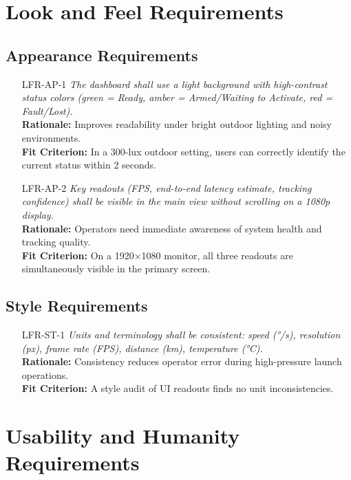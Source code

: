 \documentclass[12pt]{article}
\begin{document}
\section{Look and Feel Requirements}
\subsection{Appearance Requirements}
\begin{itemize}[leftmargin=*]
  \item[LFR-AP-1] \emph{The dashboard shall use a light background with high-contrast
          status colors (green = Ready, amber = Armed/Waiting to Activate, red =
          Fault/Lost).}\\ \textbf{Rationale:} Improves readability under bright outdoor
        lighting and noisy environments.\\ \textbf{Fit Criterion:} In a 300-lux outdoor
        setting, users can correctly identify the current status within 2 seconds.

  \item[LFR-AP-2] \emph{Key readouts (FPS, end-to-end latency estimate, tracking
          confidence) shall be visible in the main view without scrolling on a 1080p
          display.}\\ \textbf{Rationale:} Operators need immediate awareness of system
        health and tracking quality.\\ \textbf{Fit Criterion:} On a 1920×1080 monitor,
        all three readouts are simultaneously visible in the primary screen.
\end{itemize}

\subsection{Style Requirements}
\begin{itemize}[leftmargin=*]
  \item[LFR-ST-1] \emph{Units and terminology shall be consistent: speed (°/s),
          resolution (px), frame rate (FPS), distance (km), temperature (°C).}\\
        \textbf{Rationale:} Consistency reduces operator error during high-pressure
        launch operations.\\ \textbf{Fit Criterion:} A style audit of UI readouts finds
        no unit inconsistencies.
\end{itemize}

\section{Usability and Humanity Requirements}
\end{document}
